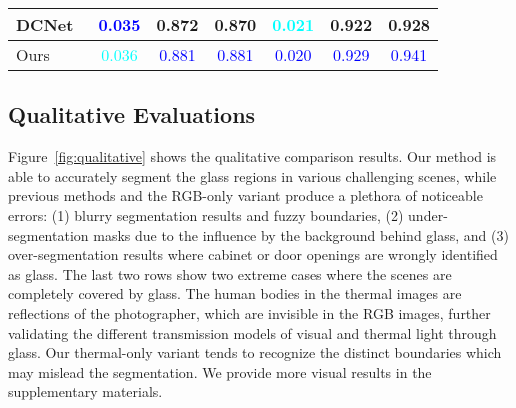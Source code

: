\begin{table}[t]
\begin{tabular}{lcccccc}
DCNet~\cite{tu2022weakly}                   & \textcolor{blue}{0.035}            & 0.872         & 0.870             & \textcolor{cyan}{0.021}            & 0.922         & 0.928               \\ 
\hline
Ours                    & \textcolor{cyan}{0.036}            & \textcolor{blue}{0.881}         & \textcolor{blue}{0.881}             & \textcolor{blue}{0.020}            & \textcolor{blue}{0.929}         & \textcolor{blue}{0.941}               \\
\bottomrule
\end{tabular}
\end{table}

\subsection{Qualitative Evaluations}
Figure~\ref{fig:qualitative} shows the qualitative comparison results. Our method is able to accurately segment the glass regions in various challenging scenes, while previous methods and the RGB-only variant produce a plethora of noticeable errors: (1) blurry segmentation results and fuzzy boundaries, (2) under-segmentation masks due to the influence by the background behind glass, and (3) over-segmentation results where cabinet or door openings are wrongly identified as glass.
The last two rows show two extreme cases where the scenes are completely covered by glass. 
The human bodies in the thermal images are reflections of the photographer, which are invisible in the RGB images, further validating the different transmission models of visual and thermal light through glass. Our thermal-only variant tends to recognize the distinct boundaries which may mislead the segmentation. We provide more visual results in the supplementary materials.




